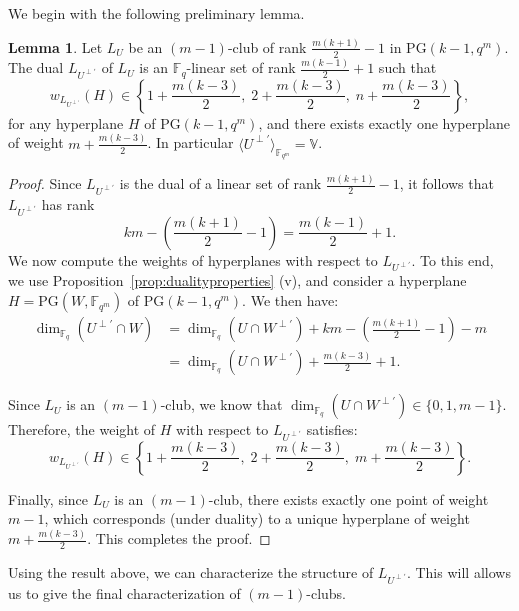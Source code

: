\documentclass[11pt]{amsart}
\theoremstyle{definition}
\newtheorem{lemma}[theorem]{Lemma}
\newcommand{\F}{{\mathbb F}}
\begin{document}
We begin with the following preliminary lemma.


\begin{lemma}\label{obs:weighdistperp}
Let $L_U$ be an $(m-1)$-club of rank $\frac{m(k+1)}{2} - 1$ in $\mathrm{PG}(k-1,q^m)$.
The dual \(L_{U^{\perp'}}\) of \(L_U\) is an \(\mathbb{F}_q\)-linear set of rank \(\frac{m(k-1)}{2} + 1\) such that 
\[
w_{L_{U^{\perp'}}}(H) \in \left\{1 + \frac{m(k-3)}{2},\; 2 + \frac{m(k-3)}{2},\; n + \frac{m(k-3)}{2} \right\},
\]
for any hyperplane \(H\) of \(\mathrm{PG}(k-1, q^m)\), and there exists exactly one hyperplane of weight \(m + \frac{m(k-3)}{2}\). In particular $\langle U^{\perp'} \rangle_{\F_{q^m}}=\mathbb{V}$.
\end{lemma}
\begin{proof}
   Since \(L_{U^{\perp'}}\) is the dual of a linear set of rank \(\frac{m(k+1)}{2} - 1\), it follows that \(L_{U^{\perp'}}\) has rank
\[
km - \left( \frac{m(k+1)}{2} - 1 \right) = \frac{m(k - 1)}{2} + 1.
\]
We now compute the weights of hyperplanes with respect to \(L_{U^{\perp'}}\). To this end, we use Proposition~\ref{prop:dualityproperties} (v), and consider a hyperplane \(H = \mathrm{PG}(W, \mathbb{F}_{q^m})\) of \(\mathrm{PG}(k-1, q^m)\). We then have:
\[
\begin{split}
\dim_{\mathbb{F}_q}(U^{\perp'} \cap W) &= \dim_{\mathbb{F}_q}(U \cap W^{\perp'}) + km - \left( \frac{m(k+1)}{2} - 1 \right) - m \\
&= \dim_{\mathbb{F}_q}(U \cap W^{\perp'}) + \frac{m(k - 3)}{2} + 1.
\end{split}
\]

Since \(L_U\) is an \((m - 1)\)-club, we know that \(\dim_{\mathbb{F}_q}(U \cap W^{\perp'}) \in \{0, 1, m - 1\}\). Therefore, the weight of \(H\) with respect to \(L_{U^{\perp'}}\) satisfies:
\[
w_{L_{U^{\perp'}}}(H) \in \left\{1 + \frac{m(k - 3)}{2},\; 2 + \frac{m(k - 3)}{2},\; m + \frac{m(k - 3)}{2} \right\}.
\]

Finally, since \(L_U\) is an \((m - 1)\)-club, there exists exactly one point of weight \(m - 1\), which corresponds (under duality) to a unique hyperplane of weight \(m + \frac{m(k - 3)}{2}\). This completes the proof.
\end{proof}

Using the result above, we can characterize the structure of $L_{U^{\perp'}}$. This will allows us to give the final characterization of $(m-1)$-clubs.
\end{document}
